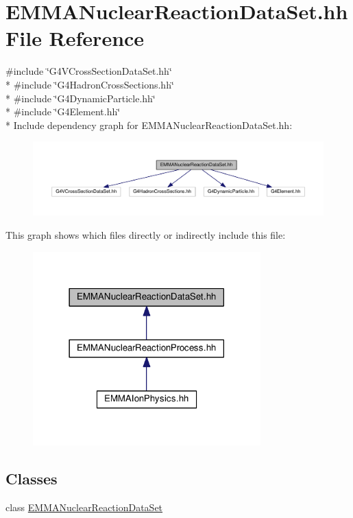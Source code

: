 \hypertarget{EMMANuclearReactionDataSet_8hh}{}\section{E\+M\+M\+A\+Nuclear\+Reaction\+Data\+Set.\+hh File Reference}
\label{EMMANuclearReactionDataSet_8hh}
{\ttfamily \#include \char`\"{}G4\+V\+Cross\+Section\+Data\+Set.\+hh\char`\"{}}\\*
{\ttfamily \#include \char`\"{}G4\+Hadron\+Cross\+Sections.\+hh\char`\"{}}\\*
{\ttfamily \#include \char`\"{}G4\+Dynamic\+Particle.\+hh\char`\"{}}\\*
{\ttfamily \#include \char`\"{}G4\+Element.\+hh\char`\"{}}\\*
Include dependency graph for E\+M\+M\+A\+Nuclear\+Reaction\+Data\+Set.\+hh\+:
\nopagebreak
\begin{figure}[H]
\begin{center}
\leavevmode
\includegraphics[width=350pt]{EMMANuclearReactionDataSet_8hh__incl}
\end{center}
\end{figure}
This graph shows which files directly or indirectly include this file\+:
\nopagebreak
\begin{figure}[H]
\begin{center}
\leavevmode
\includegraphics[width=249pt]{EMMANuclearReactionDataSet_8hh__dep__incl}
\end{center}
\end{figure}
\subsection*{Classes}
\begin{DoxyCompactItemize}
\item 
class \hyperlink{classEMMANuclearReactionDataSet}{E\+M\+M\+A\+Nuclear\+Reaction\+Data\+Set}
\end{DoxyCompactItemize}
